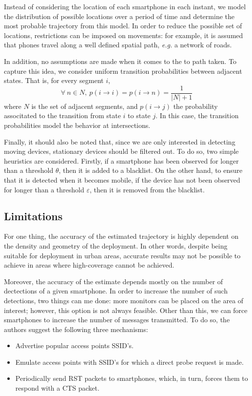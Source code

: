 \documentclass[conference]{IEEEtran}
\begin{document}
Instead of considering the location of each smartphone in each instant, we 
model the distribution of possible locations over a period of time and 
determine the most probable trajectory from this model. In order to reduce the 
possible set of locations, restrictions can be imposed on movements: for 
example, it is assumed that phones travel along a well defined spatial path, 
\textit{e.g.} a network of roads.

In addition, no assumptions are made when it comes to the to path taken. To 
capture this idea, we consider uniform transition probabilities between 
adjacent states. That is, for every segment $i$, $$\forall \ n \in N, \ p(i 
\rightarrow i) = p(i \rightarrow n) = \frac{1}{|N| + 1}$$ where $N$ is the set 
of adjacent segments, and $p(i \rightarrow j)$ the probability associtated to 
the transition from state $i$ to state $j$. In this case, the transition 
probabilities model the behavior at intersections.

Finally, it should also be noted that, since we are only interested in 
detecting moving devices, stationary devices should be filtered out. To do so, 
two simple heuristics are considered. Firstly, if a smartphone has been 
observed for longer than a threshold $\theta$, then it is added to a blacklist. 
On the other hand, to ensure that it is detected when it becomes mobile, if the 
device has not been observed for longer than a threshold $\varepsilon$, then it 
is removed from the blacklist.

\subsection{Limitations}

For one thing, the accuracy of the estimated trajectory is highly dependent on 
the density and geometry of the deployment. In other words, despite being 
suitable for deployment in urban areas, accurate results may not be possible to 
achieve in areas where high-coverage cannot be achieved.

Moreover, the accuracy of the estimate depends mostly on the number of 
dectections of a given smartphone. In order to increase the number of such 
detections, two things can me done: more monitors can be placed on the area of 
interest; however, this option is not always feasible. Other than this, we can 
force smartphones to increase the number of messages transmitted. To do so, the 
authors suggest the following three mechanisms:

\begin{itemize}
    \item Advertise popular access points SSID's.
    \item Emulate access points with SSID's for which a direct probe request is 
    made.
    \item Periodically send RST packets to smartphones, which, in turn, forces 
    them to respond with a CTS packet.
\end{itemize}
\end{document}
